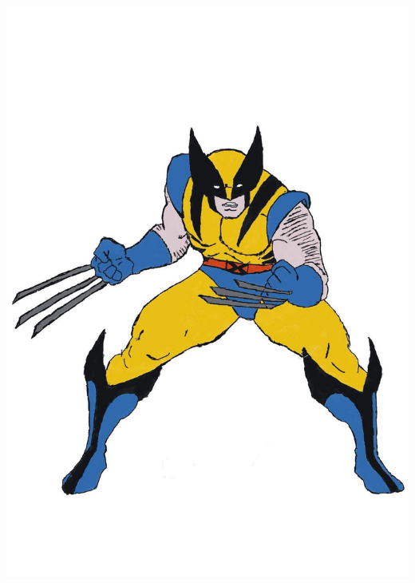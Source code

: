 \documentclass{beamer}
\begin{document}
\begin{frame}
\begin{columns}
\begin{column}{0.5\textwidth}
		\centering	\includegraphics[keepaspectratio, width  = \textwidth]{img/logan}\\
	\end{column}
	\end{columns}
\end{frame}
	
	
\end{document}
